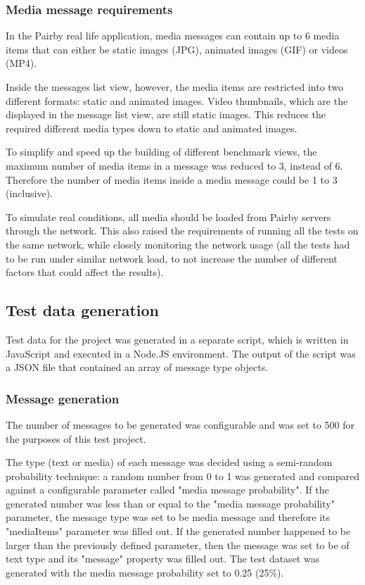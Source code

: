 \documentclass[a4paper,12pt]{article}
\begin{document}
\subsubsection*{Media message requirements}
In the Pairby real life application, media messages can contain up to 6 media items that can either be static images (JPG), animated images (GIF) or videos (MP4).

Inside the messages list view, however, the media items are restricted into two different formats: static and animated images. Video thumbnails, which are the displayed in the message list view, are still static images. This reduces the required different media types down to static and animated images.

To simplify and speed up the building of different benchmark views, the maximum number of media items in a message was reduced to 3, instead of 6. Therefore the number of media items inside a media message could be 1 to 3 (inclusive).

To simulate real conditions, all media should be loaded from Pairby servers through the network. This also raised the requirements of running all the tests on the same network, while closely monitoring the network usage (all the tests had to be run under similar network load, to not increase the number of different factors that could affect the results).

\subsection{Test data generation}
Test data for the project was generated in a separate script, which is written in JavaScript and executed in a Node.JS environment. The output of the script was a JSON file that contained an array of message type objects.

\subsubsection*{Message generation}
The number of messages to be generated was configurable and was set to 500 for the purposes of this test project.

The type (text or media) of each message was decided using a semi-random probability technique: a random number from 0 to 1 was generated and compared against a configurable parameter called "media message probability". If the generated number was less than or equal to the "media message probability" parameter, the message type was set to be media message and therefore its "mediaItems" parameter was filled out. If the generated number happened to be larger than the previously defined parameter, then the message was set to be of text type and its "message" property was filled out. The test dataset was generated with the media message probability set to 0.25 (25\%).
\end{document}
